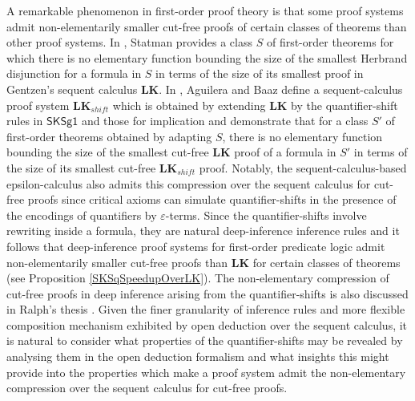 \documentclass[10pt]{article}
\theoremstyle{definition}\newtheorem{remark}[theorem]{Remark}
\theoremstyle{definition}\newtheorem{example}[theorem]{Example}
\theoremstyle{definition}\newtheorem{definition}[theorem]{Definition}
\newcommand{\SKSq}{{\mathsf{SKSg1}}}
\begin{document}
	A remarkable phenomenon in first-order proof theory is that some proof systems admit non-elementarily smaller cut-free proofs of certain classes of theorems than other proof systems. In \cite{StatmanLowerBounds}, Statman provides a class $S$ of first-order theorems for which there is no elementary function bounding the size of the smallest Herbrand disjunction for a formula in $S$ in terms of the size of its smallest proof in Gentzen's sequent calculus $\textbf{LK}$. In \cite{BaazUnsoundInferences}, Aguilera and Baaz define a sequent-calculus proof system $\textbf{LK}_{shift}$ which is obtained by extending $\textbf{LK}$ by the quantifier-shift rules in $\SKSq$ and those for implication and demonstrate that for a class $S'$ of first-order theorems obtained by adapting $S$, there is no elementary function bounding the size of the smallest cut-free $\textbf{LK}$ proof of a formula in $S'$ in terms of the size of its smallest cut-free $\textbf{LK}_{shift}$ proof. Notably, the sequent-calculus-based epsilon-calculus also admits this compression over the sequent calculus for cut-free proofs \cite{BaazLolicEpsilonShorterProofs} since critical axioms can simulate quantifier-shifts in the presence of the encodings of quantifiers by $\varepsilon$-terms. Since the quantifier-shifts involve rewriting inside a formula, they are natural deep-inference inference rules and it follows that deep-inference proof systems for first-order predicate logic admit non-elementarily smaller cut-free proofs than $\textbf{LK}$ for certain classes of theorems (see Proposition \ref{SKSqSpeedupOverLK}). The non-elementary compression of cut-free proofs in deep inference arising from the quantifier-shifts is also discussed in Ralph's thesis \cite{BenThesis}. Given the finer granularity of inference rules and more flexible composition mechanism exhibited by open deduction over the sequent calculus, it is natural to consider what properties of the quantifier-shifts may be revealed by analysing them in the open deduction formalism and what insights this might provide into the properties which make a proof system admit the non-elementary compression over the sequent calculus for cut-free proofs.
	
\end{document}
